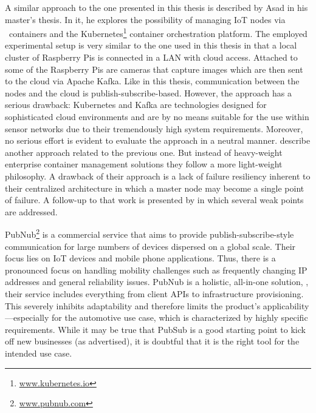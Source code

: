 A similar approach to the one presented in this thesis is described by Asad \citeauthor*{javed2016container} \cite{javed2016container} in his master's thesis. In it, he explores the possibility of managing IoT nodes via \docker\ containers and the Kubernetes\footnote{\url{www.kubernetes.io}} container orchestration platform. The employed experimental setup is very similar to the one used in this thesis in that a local cluster of Raspberry Pis is connected in a LAN with cloud access. Attached to some of the Raspberry Pis are cameras that capture images which are then sent to the cloud via Apache Kafka. Like in this thesis, communication between the nodes and the cloud is publish-subscribe-based. However, the approach has a serious drawback: Kubernetes and Kafka are technologies designed for sophisticated cloud environments and are by no means suitable for the use within sensor networks due to their tremendously high system requirements. Moreover, no serious effort is evident to evaluate the approach in a neutral manner.
\citeauthor*{grossmann2016hypriot} \cite{grossmann2016hypriot} describe another approach related to the previous one. But instead of heavy-weight enterprise container management solutions they follow a more light-weight philosophy. A drawback of their approach is a lack of failure resiliency inherent to their centralized architecture in which a master node may become a single point of failure. A follow-up to that work is presented by \citeauthor*{celesti2017watchdog} \cite{celesti2017watchdog} in which several weak points are addressed.

%
%
%

PubNub\footnote{\url{www.pubnub.com}} is a commercial service that aims to provide publish-subscribe-style communication for large numbers of devices dispersed on a global scale. Their focus lies on IoT devices and mobile phone applications. Thus, there is a pronounced focus on handling mobility challenges such as frequently changing IP addresses and general reliability issues. PubNub is a holistic, all-in-one solution, \ie , their service includes everything from client APIs to infrastructure provisioning. This severely inhibits adaptability and therefore limits the product's applicability---especially for the automotive use case, which is characterized by highly specific requirements. While it may be true that PubSub is a good starting point to kick off new businesses (as advertised), it is doubtful that it is the right tool for the intended use case.

%
%
%


